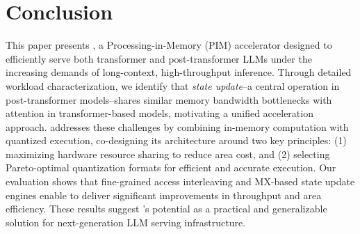 \section{Conclusion}

This paper presents \sysname{}, a Processing-in-Memory (PIM)
accelerator designed to efficiently serve both transformer and
post-transformer LLMs under the increasing demands of long-context,
high-throughput inference.
%
Through detailed workload characterization, we identify that
\emph{state update}--a central operation in post-transformer
models--shares similar memory bandwidth bottlenecks with attention in
transformer-based models, motivating a unified acceleration approach.
%
\sysname{} addresses these challenges by combining in-memory
computation with quantized execution, co-designing its architecture
around two key principles: (1) maximizing hardware resource sharing
to reduce area cost, and (2) selecting Pareto-optimal quantization
formats for efficient and accurate execution.
%
Our evaluation shows that fine-grained access interleaving and
MX-based state update engines enable \sysname{} to deliver significant
improvements in throughput and area efficiency.
%
These results suggest \sysname{}'s potential as a practical and
generalizable solution for next-generation LLM serving infrastructure.

